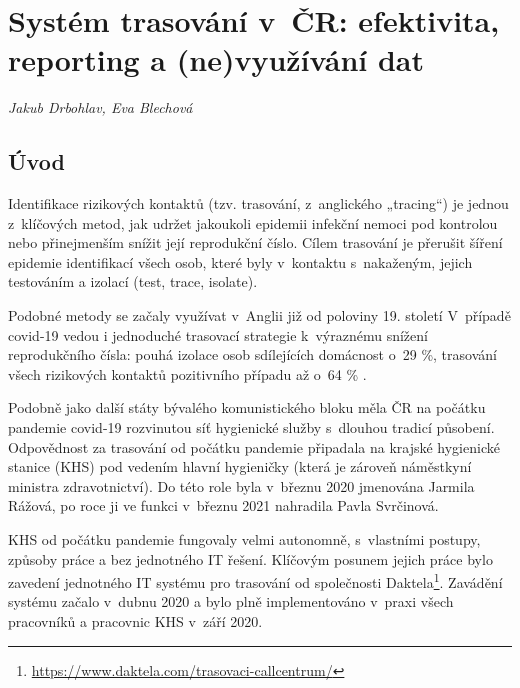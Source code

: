 \chapter[Systém trasování v~ČR]{Systém trasování v~ČR: efektivita, reporting a (ne)využívání dat}\label{Trasovani}

\textit{Jakub Drbohlav, Eva Blechová}
\vspace{15mm}

\section*{Úvod}

Identifikace rizikových kontaktů (tzv. trasování, z~anglického „tracing“) je jednou z~klíčových metod, jak udržet jakoukoli epidemii infekční nemoci pod kontrolou nebo přinejmenším snížit její reprodukční číslo. Cílem trasování je přerušit šíření epidemie identifikací všech osob, které byly v~kontaktu s~nakaženým, jejich testováním a izolací (test, trace, isolate).

Podobné metody se začaly využívat v~Anglii již od poloviny 19. století \cite{pg:mooney2020} V~případě covid-19 vedou i jednoduché trasovací strategie k~výraznému snížení reprodukčního čísla: pouhá izolace osob sdílejících domácnost o~29 \%, trasování všech rizikových kontaktů pozitivního případu až o~64 \% \cite{pg:kucharski2020}.

Podobně jako další státy bývalého komunistického bloku měla ČR na počátku pandemie covid-19 rozvinutou síť hygienické služby s~dlouhou tradicí působení. Odpovědnost za trasování od počátku pandemie připadala na krajské hygienické stanice (KHS) pod vedením hlavní hygieničky (která je zároveň náměstkyní ministra zdravotnictví). Do této role byla v~březnu 2020 jmenována Jarmila Rážová, po roce ji ve funkci v~březnu 2021 nahradila Pavla Svrčinová.

KHS od počátku pandemie fungovaly velmi autonomně, s~vlastními postupy, způsoby práce a bez jednotného IT řešení. Klíčovým posunem jejich práce bylo zavedení jednotného IT systému pro trasování od společnosti Daktela\footnote{\url{https://www.daktela.com/trasovaci-callcentrum/}}. Zavádění systému začalo v~dubnu 2020 a bylo plně implementováno v~praxi všech pracovníků a pracovnic KHS v~září 2020.

